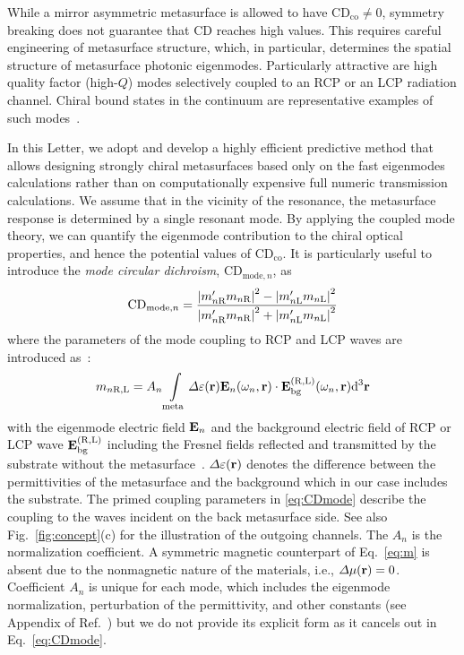 \documentclass[
    reprint,
    superscriptaddress,
    a4paper,
    amsmath,amssymb,
    prb,
]{revtex4-2}
\begin{document}
While a mirror asymmetric metasurface is allowed to have $\mathrm{CD}_{\text{co}} \neq 0$, symmetry breaking does not guarantee that CD reaches high values. This requires careful engineering of metasurface structure, which, in particular, determines the spatial structure of metasurface photonic eigenmodes. 
Particularly attractive are high quality factor (high-$Q$) modes selectively coupled to an RCP or an LCP radiation channel. Chiral bound states in the continuum are representative examples of such modes~\cite{Gorkunov2020Aug,Overvig2021Feb,kuhner2023}.



In this Letter, we adopt and develop a highly efficient predictive method that allows designing strongly chiral metasurfaces based only on the fast eigenmodes calculations rather than on computationally expensive full numeric transmission calculations.
We assume that in the vicinity of the resonance, the metasurface response is determined by a single resonant mode. By applying the coupled mode theory, we can quantify the eigenmode contribution to the chiral optical properties, and hence the potential values of $\mathrm{CD}_{\text{co}}$. It is particularly useful to introduce the \textit{mode circular dichroism}, $\mathrm{CD}_{\text{mode},n}$, as~\cite{SM}
\begin{equation}
    \mathrm{CD}_{\text{mode},n} = \frac{\abs{m^{\prime}_{n \text{R}}m_{n\text{R}}}^2 - \abs{m^{\prime}_{n\text{L}}m_{n\text{L}}}^2}{\abs{m^{\prime}_{n\text{R}}m_{n\text{R}}}^2 + \abs{m^{\prime}_{n\text{L}}m_{n\text{L}}}^2}
    \label{eq:CDmode}
\end{equation}
where the parameters of the mode coupling to RCP and LCP waves are introduced as~\cite{Weiss2018PRB,Gorkunov2020Aug,koshelev2022PhDthesis,Koshelev2020Science}:
\begin{equation}
    m_{n\text{R,L}} = A_n \int \limits_{\text{meta}} \Delta \varepsilon (\vb{r}) \vb{E}_n (\omega_n, \vb{r}) \cdot \vb{E}_{\text{bg}}^{(\mathrm{R}, \mathrm{L})} (\omega_n, \vb{r}) \dd^{3} \vb{r}
    \label{eq:m}
\end{equation}
with the eigenmode electric field $\vb{E}_n$ and the background electric field of RCP or LCP wave $\vb{E}_{\text{bg}}^{(\mathrm{R},\mathrm{L})}$ including the Fresnel fields reflected and transmitted by the substrate without the metasurface~\cite[Sec.~VI]{Weiss2018PRB,note_one}. 
$\Delta \varepsilon (\vb{r})$ denotes the difference between the permittivities of the metasurface and the background which in our case includes the substrate.
The primed coupling parameters in \eqref{eq:CDmode} describe the coupling to the waves incident on the back metasurface side. See also Fig.~\ref{fig:concept}{(c)} for the illustration of the outgoing channels.
The $A_n$ is the normalization coefficient.  
A symmetric magnetic counterpart of Eq.~\eqref{eq:m} is absent due to the nonmagnetic nature of the materials, i.e., $\Delta \mu (\vb{r}) =0$.
Coefficient $A_n$ is unique for each mode, which includes the eigenmode normalization, perturbation of the permittivity, and other constants (see Appendix of Ref.~\cite{koshelev2022PhDthesis}) but we do not provide its explicit form as it cancels out in Eq.~\eqref{eq:CDmode}.
\end{document}
